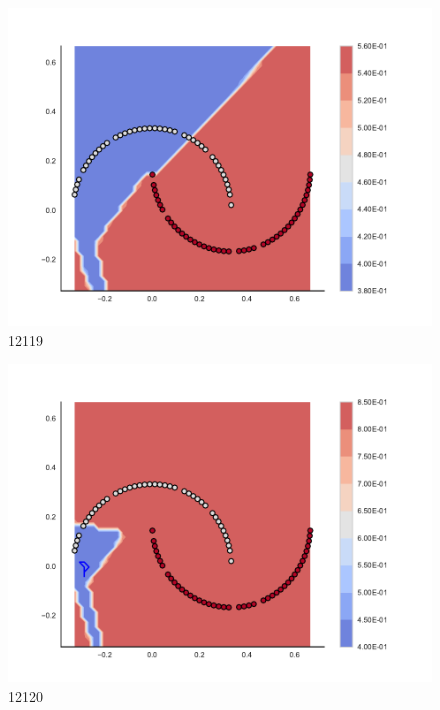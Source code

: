 \begin{subfigure}[b]{0.09\textwidth}
    \includegraphics[clip, trim=2.35cm 1.75cm 4.5cm 0cm,width=\textwidth]{img/convergence/12119.pdf}
    \caption{12119}
    \label{fig:convergence_12119}
\end{subfigure}
%
\begin{subfigure}[b]{0.09\textwidth}
    \includegraphics[clip, trim=2.35cm 1.75cm 4.5cm 0cm,width=\textwidth]{img/convergence/12120.pdf}
    \caption{12120}
    \label{fig:convergence_12120}
\end{subfigure}
%
